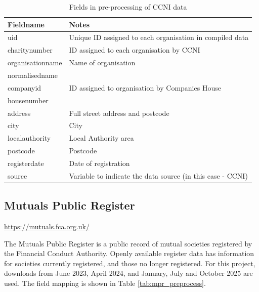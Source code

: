 \documentclass{article}
\begin{document}
\begin{table}[h]
  \centering
  \begin{tabularx}{\textwidth}{|l|X|}
    \hline
    Fieldname  &	Notes \\
    \hline \hline
uid & Unique ID assigned to each organisation in compiled data \\ \hline
charitynumber & ID assigned to each organisation by CCNI \\ \hline
organisationname & Name of organisation \\ \hline
normalisedname & \\ \hline
companyid & ID assigned to organisation by Companies House \\ \hline
housenumber & \\ \hline
address & Full street address and postcode \\ \hline
city & City \\ \hline
localauthority & Local Authority area \\ \hline
postcode & Postcode \\ \hline
registerdate & Date of registration \\ \hline
source & Variable to indicate the data source (in this case - CCNI) \\ \hline
\end{tabularx}
\caption{Fields in pre-processing of CCNI data}
\label{tab:ccni_preprocess}
\end{table}


\clearpage
\subsection{Mutuals Public Register }
\url{https://mutuals.fca.org.uk/}

The Mutuals Public Register is a public record of mutual societies registered by the Financial Conduct Authority. 
Openly available register data has information for societies currently registered, and those no longer registered.
For this project, downloads from June 2023, April 2024, and January, July and October 2025 are used. The field mapping is shown in Table 
\ref{tab:mpr_preprocess}. 
\end{document}
